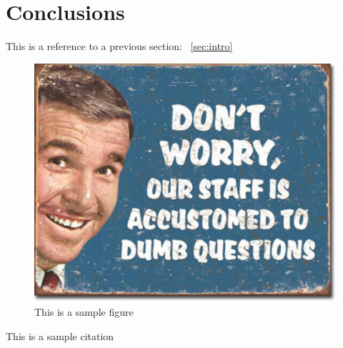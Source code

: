 \chapter{Conclusions}
\label{sec:Conclusions}

This is a reference to a previous section: ~\ref{sec:intro}

\begin{figure}
\begin{center}
\includegraphics[width=.89\linewidth]{dumb-questions.pdf}
\caption{This is a sample figure}
\label{fig:sample}

\end{center}
\end{figure}

This is a sample citation~\cite{ATLAS:2013mla}
